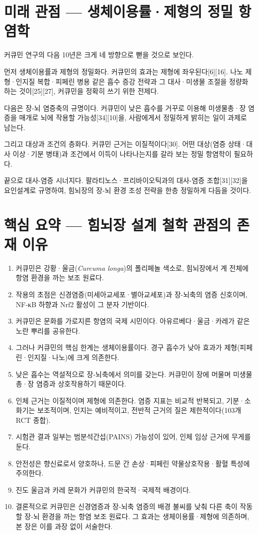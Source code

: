 \documentclass[12pt,oneside]{book}
\begin{document}
\section{미래 관점 — 생체이용률·제형의 정밀 항염학}

커큐민 연구의 다음 10년은 크게 네 방향으로 뻗을 것으로 보인다.

먼저 생체이용률과 제형의 정밀화다. 커큐민의 효과는 제형에 좌우된다[6][16]. 나노 제형·인지질 복합·피페린 병용 같은 흡수 증강 전략과 그 대사·미생물 조절을 정량화하는 것이[25][27], 커큐민을 정확히 쓰기 위한 전제다.

다음은 장-뇌 염증축의 규명이다. 커큐민이 낮은 흡수를 거꾸로 이용해 미생물총·장 염증을 매개로 뇌에 작용할 가능성[34][10]을, 사람에게서 정밀하게 밝히는 일이 과제로 남는다.

그리고 대상과 조건의 층화다. 커큐민 근거는 이질적이다[30]. 어떤 대상(염증 상태·대사 이상·기분 병태)과 조건에서 이득이 나타나는지를 갈라 보는 정밀 항염학이 필요하다.

끝으로 대사-염증 시너지다. 팔라티노스·프리바이오틱과의 대사-염증 조합[31][32]을 요인설계로 규명하여, 힘뇌장의 장-뇌 환경 조성 전략을 한층 정밀하게 다듬을 것이다.

\section{핵심 요약 — 힘뇌장 설계 철학 관점의 존재 이유}

\begin{enumerate}[leftmargin=6mm,itemsep=1pt,topsep=2pt]
  \item 커큐민은 강황·울금(\textit{Curcuma longa})의 폴리페놀 색소로, 힘뇌장에서 계 전체에 항염 환경을 까는 보조 원료다.
  \item 작용의 초점은 신경염증(미세아교세포·별아교세포)과 장-뇌축의 염증 신호이며, NF-κB 하향과 Nrf2 활성이 그 분자 기반이다.
  \item 커큐민은 문화를 가로지른 항염의 국제 시민이다. 아유르베다·울금·카레가 같은 노란 뿌리를 공유한다.
  \item 그러나 커큐민의 핵심 한계는 생체이용률이다. 경구 흡수가 낮아 효과가 제형(피페린·인지질·나노)에 크게 의존한다.
  \item 낮은 흡수는 역설적으로 장-뇌축에서 의미를 갖는다. 커큐민이 장에 머물며 미생물총·장 염증과 상호작용하기 때문이다.
  \item 인체 근거는 이질적이며 제형에 의존한다. 염증 지표는 비교적 반복되고, 기분·소화기는 보조적이며, 인지는 예비적이고, 전반적 근거의 질은 제한적이다(103개 RCT 종합).
  \item 시험관 결과 일부는 범분석간섭(PAINS) 가능성이 있어, 인체 임상 근거에 무게를 둔다.
  \item 안전성은 향신료로서 양호하나, 드문 간 손상·피페린 약물상호작용·활혈 특성에 주의한다.
  \item 진도 울금과 카레 문화가 커큐민의 한국적·국제적 배경이다.
  \item 결론적으로 커큐민은 신경염증과 장-뇌축 염증의 배경 불씨를 낮춰 다른 축이 작동할 장-뇌 환경을 까는 항염 보조 원료다. 그 효과는 생체이용률·제형에 의존하며, 본 장은 이를 과장 없이 서술한다.
\end{enumerate}
\end{document}
